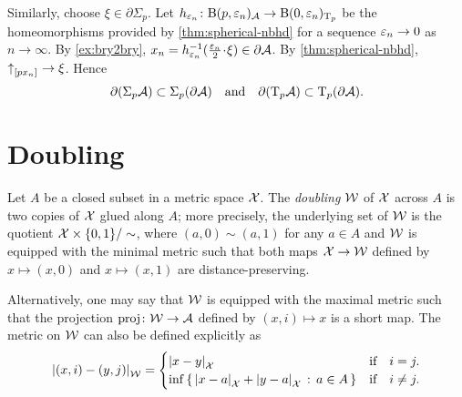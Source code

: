 Similarly, choose $\xi\in\partial\Sigma_p$.
Let $h_{\varepsilon_n}\colon\mathrm{B}{}(p,\varepsilon_n)_{\mathcal{A}}\to \mathrm{B}{}(0,\varepsilon_n)_{\mathrm{T}_p}$ be the homeomorphisms provided by \ref{thm:spherical-nbhd} for a sequence $\varepsilon_n\to 0$ as $n\to\infty$.
By \ref{ex:bry2bry}, $x_n=h_{\eps_n}^{-1}(\tfrac{\eps_n}2\cdot\xi)\in \partial \spc{A}$.
By \ref{thm:spherical-nbhd}, ${\uparrow}_{[{p}{x_n}]_{{}}}\to \xi$.
Hence
\[\partial (\Sigma_p\mathcal{A})\subset\Sigma_p(\partial\mathcal{A})
\quad\text{and}\quad\partial(\mathrm{T}_p\mathcal{A})\subset\mathrm{T}_p(\partial\mathcal{A}).\]
\qedsf

\section{Doubling}

Let $A$ be a closed subset in a metric space $\mathcal{X}$.
The \emph{doubling} $\mathcal{W}$ of $\mathcal{X}$ across $A$ is two copies of $\mathcal{X}$ glued along $A$;
more precisely, the underlying set of $\mathcal{W}$ is the quotient $\mathcal{X}\times\{0,1\}/\sim$, where $(a,0)\sim (a,1)$ for any $a\in A$ and $\mathcal{W}$ is equipped with the minimal metric such that both maps $\mathcal{X}\to \mathcal{W}$ defined by $x\mapsto (x,0)$ and $x\mapsto (x,1)$ are distance-preserving.

Alternatively, one may say that $\mathcal{W}$ is equipped with the maximal metric such that the projection $\operatorname{\rm proj}\nolimits\colon\mathcal{W}\to\mathcal{A}$ defined by $(x,i)\mapsto x$ is a short map. 
The metric on $\mathcal{W}$ can also be defined explicitly as
\[|{(x,i)}-{(y,j)}|_{\mathcal{W}}^{{}}=
\begin{cases}
|{x}-{y}|_{\mathcal{X}}^{{}}&\text{if}\quad i= j.
\\
\inf\left\{\,{|{x}-{a}|_{\mathcal{X}}^{{}}+|{y}-{a}|_{\mathcal{X}}^{{}}}\,:\,{a\in A}\,\right\}&\text{if}\quad i\ne j.
\end{cases}
\]

